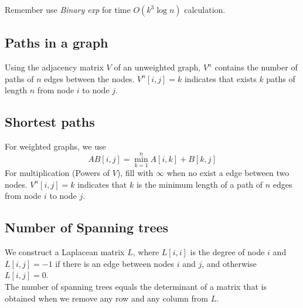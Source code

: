 Remember use \textit{Binary exp} for time $O(k^3\log n)$ calculation.

\subsection{Paths in a graph}

Using the adjacency matrix $V$ of an unweighted graph, $V^n$ contains the number of paths of $n$ edges between the nodes.
$V^n[i, j]=k$ indicates that exists $k$ paths of length $n$ from node $i$ to node $j$.

\subsection{Shortest paths}

For weighted graphs, we use
$$AB[i,j] = \min_{k=1}^n A[i,k] + B[k,j]$$
For multiplication (Powers of $V$), fill with $\infty$ when no exist a edge between two nodes.
$V^n[i, j]=k$ indicates that $k$ is the minimum length of a path of $n$ edges from node $i$ to node $j$.

\subsection{Number of Spanning trees}

We construct a Laplacean matrix $L$, where $L[i,i]$ is the degree of node $i$ and $L[i,j]=-1$ if there is an edge between nodes $i$ and $j$, and otherwise $L[i,j]=0$.\\
The number of spanning trees equals the determinant of a matrix that is obtained when we remove any row and any column from $L$.

